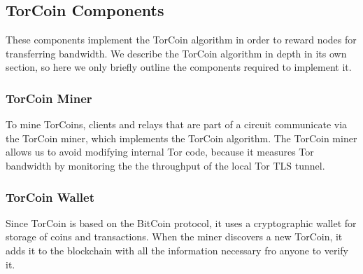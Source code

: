 \subsection{TorCoin Components} These components implement the TorCoin algorithm
in order to reward nodes for transferring bandwidth. We describe the TorCoin algorithm in depth in its own section, so here we only briefly outline the 
components required to implement it.

\subsubsection{TorCoin Miner} To mine TorCoins, clients and relays that are part
of a circuit communicate via the TorCoin miner, which implements the TorCoin
algorithm. The TorCoin miner allows us to avoid modifying internal Tor code,
because it measures Tor bandwidth by monitoring the the throughput of the local
Tor TLS tunnel.

\subsubsection{TorCoin Wallet} Since TorCoin is based on the BitCoin protocol,
it uses a cryptographic wallet for storage of coins and transactions. When the
miner discovers a new TorCoin, it adds it to the blockchain with all the
information necessary fro anyone to verify it.